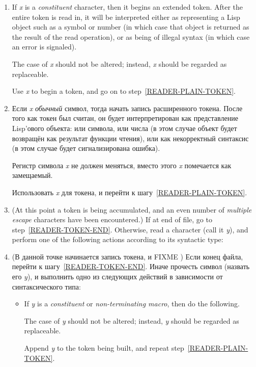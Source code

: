 \begin{enumerate}
\item
If \emph{x} is a \emph{constituent} character, then it begins an extended token.
\label{READER-CONSTITUENT}\relax
After the entire token is read in, it will be interpreted
either as representing a Lisp object such as a symbol or number
(in which case that object is returned as the result of the read operation),
or as being of illegal syntax (in which case an error is signaled).

The case of \emph{x\/} should not be altered; instead,
\emph{x} should be regarded as replaceable.

Use \emph{x} to begin a token, and go on to step~\ref{READER-PLAIN-TOKEN}.

\item Если \emph{x} \emph{обычный} символ, тогда начать запись расширенного токена.
\label{READER-CONSTITUENT}\relax
После того как токен был считан, он будет интерпретирован как
представление Lisp'ового объекта: или символа, или числа (в этом
случае объект будет возвращён как результат функции чтения), или как
некорректный синтаксис (в этом случае будет сигнализирована ошибка).

Регистр символа \emph{x} не должен меняться, вместо этого \emph{x}
помечается как замещаемый.

Использовать \emph{x} для токена, и перейти к шагу~\ref{READER-PLAIN-TOKEN}.

\item
(At this point a token is being accumulated, and an even number
of \emph{multiple escape} characters have been encountered.)
If at end of file, go to step~\ref{READER-TOKEN-END}.
Otherwise, read a character (call it \emph{y}), and
perform one of the following actions according to its syntactic type:
\label{READER-PLAIN-TOKEN}

\item (В данной точке начинается запись токена, и FIXME ) Если конец файла, перейти к
  шагу~\ref{READER-TOKEN-END}.  Иначе прочесть символ (назвать его
  \emph{y}), и выполнить одно из следующих действий в зависимости от
  синтаксического типа:
\label{READER-PLAIN-TOKEN}
\begin{itemize}
\item
If \emph{y} is a \emph{constituent} or \emph{non-terminating macro},
then do the following.

The case of \emph{y\/} should not be altered; instead,
\emph{y} should be regarded as replaceable.

Append \emph{y} to the token being built,
and repeat step~\ref{READER-PLAIN-TOKEN}.


\end{itemize}
\end{enumerate}
